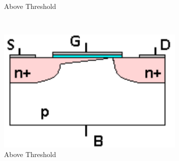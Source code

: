 \begin{enumerate}
\begin{figure}[ht]
\begin{subfigure}[b]{0.40\linewidth}
    \caption{Above Threshold} 
    \label{fig:channel} 
    \vspace{4ex}
  \end{subfigure}\\
  \begin{subfigure}[b]{0.40\linewidth}
    \centering
    \includegraphics[width=0.90\linewidth]{figures/prelab_pinched.png} 
    \caption{Above Threshold} 
    \label{fig:pinched} 
    \vspace{4ex}
  \end{subfigure}
  \caption{}
  \label{fig:nMOS} 
\end{figure}
\end{enumerate}
